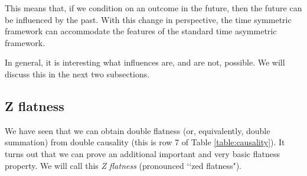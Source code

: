 \documentclass[10pt]{article}
\begin{document}
This means that, if we condition on an outcome in the future, then the future can be influenced by the past.   With this change in perspective, the time symmetric framework can accommodate the features of the standard time asymmetric framework.

In general, it is interesting what influences are, and are not, possible.  We will discuss this in the next two subsections.




\subsection{Z flatness}\label{sec:doubleZflatness}


We have seen that we can obtain double flatness (or, equivalently, double summation) from double causality (this is row 7 of Table \ref{table:causality}).  It turns out that we can prove an additional important and very basic flatness property.  We will call this \emph{Z flatness} (pronounced \lq\lq zed flatness").  %
\end{document}
